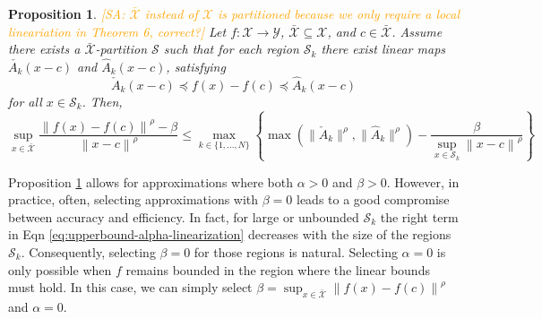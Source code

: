 \documentclass[11pt, a4paper, oneside,reqno]{amsart}
\theoremstyle{plain}
\newtheorem{proposition}[theorem]{Proposition}
\newcommand{\norm}[1]{\left\lVert#1\right\rVert}
\def\sS{{\mathcal{S}}}
\def\sX{{\mathcal{X}}}
\def\sY{{\mathcal{Y}}}
\def\bsS{{\bm{\mathcal{S}}}}
\def\mA{{{A}}}
\def\vx{{{x}}}
\newcommand{\SA}[1]{\textcolor{orange}{[SA: #1]}}
\begin{document}
    \begin{proposition}\label{prop:main-heuristics-for-alpha-beta}
        \SA{\(\bar{\sX}\) instead of \(\sX\) is partitioned because we only require a local lineariation in Theorem 6, correct?}
        Let \(f:\sX\rightarrow\sY\), $\bar\sX \subseteq \sX$, and $c \in \bar\sX$. Assume there exists a $\bar\sX$-partition $\bsS$ such that for each region \(\sS_k\) there exist linear maps \(\check{\mA_k}(\vx-c)\) and \(\hat{\mA}_k(\vx-c)\), satisfying 
        \begin{equation}
            \check{\mA}_k(\vx-c) \preceq f(\vx) - f(c) \preceq \hat{\mA}_k(\vx-c)
        \end{equation}
        for all \(\vx\in\sS_k\). Then, 
    \begin{equation}\label{eq:upperbound-alpha-linearization}
            \sup_{x\in \bar\sX} \frac{\norm{f(x)-f(c)}^\rho - \beta}{\norm{x-c}^\rho} \leq \max_{k \in \{1,...,N\}} \left\{ \max\left(\|\check{\mA}_k\|^\rho,\|\hat{\mA}_k\|^\rho\right) - \frac{\beta}{\sup_{x\in \sS_k}\norm{x-c}^\rho} \right\}
        \end{equation}
    \end{proposition} 
    Proposition \ref{prop:main-heuristics-for-alpha-beta} allows for approximations where both $\alpha >0$ and $\beta >0$. However, in practice, often, selecting approximations with $\beta=0$ leads to a good compromise between accuracy and efficiency. In fact, for large or unbounded $\sS_k$ the right term in Eqn \eqref{eq:upperbound-alpha-linearization} decreases with the size of the regions $\sS_k$. Consequently, selecting  $\beta=0$ for those regions is natural. Selecting $\alpha=0$ is only possible when $f$ remains bounded in the region where the linear bounds must hold. In this case, we can simply select $\beta = \sup_{x \in \bar\sX} \norm{f(x)-f(c)}^\rho$ and $\alpha=0$. 
    
\end{document}
